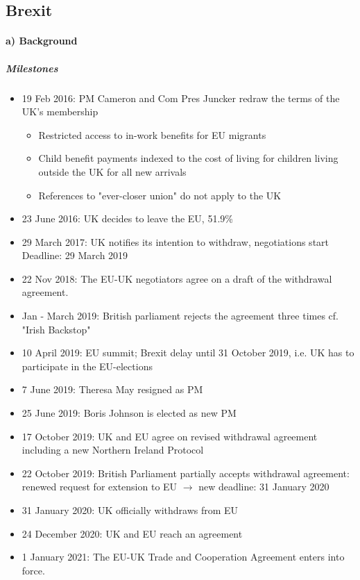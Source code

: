 \subsection{Brexit}

\paragraph{a) Background}

\subparagraph{Milestones}

\begin{itemize}
    \item 19 Feb 2016: PM Cameron and Com Pres Juncker redraw the terms
        of the UK's membership
        \begin{itemize}
            \item Restricted access to in-work benefits for EU migrants
            \item Child benefit payments indexed to the cost of living
                for children living outside the UK for all new arrivals
            \item References to "ever-closer union" do not apply to the UK
        \end{itemize}
    \item 23 June 2016: UK decides to leave the EU, 51.9\%
    \item 29 March 2017: UK notifies its intention to withdraw, negotiations
        start Deadline: 29 March 2019
    \item 22 Nov 2018: The EU-UK negotiators agree on a draft of the
        withdrawal agreement.
    \item Jan - March 2019: British parliament rejects the agreement three
        times cf. "Irish Backstop"
    \item 10 April 2019: EU summit; Brexit delay until 31 October 2019, i.e.
        UK has to participate in the EU-elections
    \item 7 June 2019: Theresa May resigned as PM
    \item 25 June 2019: Boris Johnson is elected as new PM
    \item 17 October 2019: UK and EU agree on revised withdrawal agreement
        including a new Northern Ireland Protocol
    \item 22 October 2019: British Parliament partially accepts withdrawal
        agreement: renewed request for extension to EU
        $\rightarrow$ new deadline: 31 January 2020
    \item 31 January 2020: UK officially withdraws from EU
    \item 24 December 2020: UK and EU reach an agreement
    \item 1 January 2021: The EU-UK Trade and Cooperation Agreement enters
        into force.
\end{itemize}

